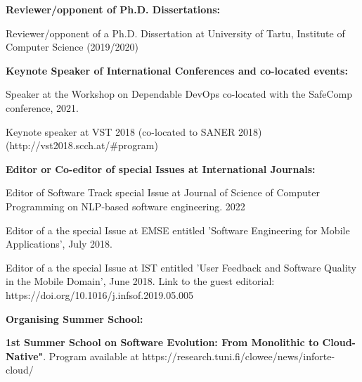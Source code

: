 \documentclass[10pt]{article}
\begin{document}
\textbf{Reviewer/opponent of Ph.D. Dissertations:}
\begin{innerlist}
\item Reviewer/opponent of a Ph.D. Dissertation  at University of Tartu, Institute of Computer Science (2019/2020) \\
	\end{innerlist}

\textbf{Keynote Speaker of International Conferences and co-located events:}
\begin{innerlist}
\item Speaker at the Workshop on Dependable DevOps co-located with the SafeComp conference, 2021.\\
\item Keynote speaker at VST 2018 (co-located to SANER 2018) \\(http://vst2018.scch.at/\#program) 
	\\
\end{innerlist}

\textbf{Editor or Co-editor of special Issues at International Journals:}
\begin{innerlist}
\item Editor of Software Track special Issue at Journal of Science of Computer Programming on NLP-based software engineering. 2022
\item Editor of a the special Issue at EMSE entitled 'Software Engineering for Mobile Applications', July 2018.
\item Editor of a the special Issue at IST entitled 'User Feedback and Software Quality in the Mobile Domain',  June 2018. Link to the guest editorial:\\ https://doi.org/10.1016/j.infsof.2019.05.005
	\\
\end{innerlist}

\textbf{Organising Summer School:}
\begin{innerlist}
\item \textbf{1st Summer School on Software Evolution: From Monolithic to Cloud-Native"}. Program available at https://research.tuni.fi/clowee/news/inforte-cloud/ 
	\\
\end{innerlist}

\end{document}
